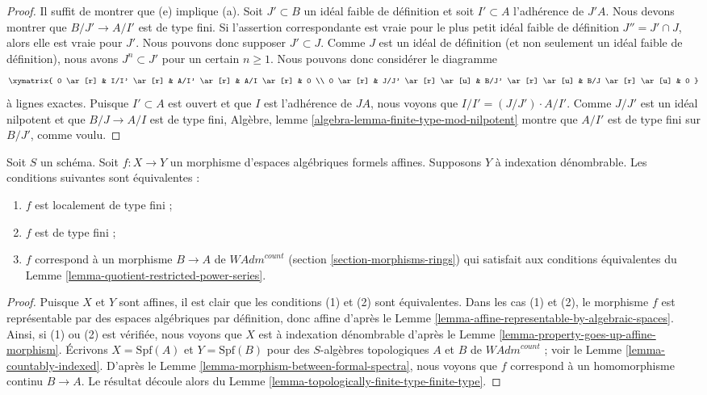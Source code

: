 \begin{proof}
Il suffit de montrer que (e) implique (a). Soit $J' \subset B$ un idéal faible
de définition et soit $I' \subset A$ l'adhérence de $J'A$. Nous devons
montrer que $B/J' \to A/I'$ est de type fini. Si l'assertion correspondante
est vraie pour le plus petit idéal faible de définition $J'' = J' \cap J$, alors elle
est vraie pour $J'$. Nous pouvons donc supposer $J' \subset J$. Comme $J$ est un idéal
de définition (et non seulement un idéal faible de définition), nous avons
$J^n \subset J'$ pour un certain $n \geq 1$. Nous pouvons donc considérer le
diagramme
$$
\xymatrix{
0 \ar[r] & I/I' \ar[r] & A/I' \ar[r] & A/I \ar[r] & 0 \\
0 \ar[r] & J/J' \ar[r] \ar[u] & B/J' \ar[r] \ar[u] & B/J \ar[r] \ar[u] & 0
}
$$
à lignes exactes. Puisque $I' \subset A$ est ouvert et que
$I$ est l'adhérence de $J A$, nous voyons que $I/I' = (J/J') \cdot A/I'$.
Comme $J/J'$ est un idéal nilpotent et que $B/J \to A/I$ est de type fini,
Algèbre, lemme \ref{algebra-lemma-finite-type-mod-nilpotent} montre
que $A/I'$ est de type fini sur $B/J'$, comme voulu.
\end{proof}

\begin{lemma}
\label{lemma-representable-affine-finite-type}
Soit $S$ un schéma. Soit $f : X \to Y$ un morphisme d'espaces algébriques
formels affines. Supposons $Y$ à indexation dénombrable.
Les conditions suivantes sont équivalentes :
\begin{enumerate}
\item $f$ est localement de type fini ;
\item $f$ est de type fini ;
\item $f$ correspond à un morphisme $B \to A$ de $\textit{WAdm}^{count}$
(section \ref{section-morphisms-rings})
qui satisfait aux conditions équivalentes du
Lemme \ref{lemma-quotient-restricted-power-series}.
\end{enumerate}
\end{lemma}

\begin{proof}
Puisque $X$ et $Y$ sont affines, il est clair que les conditions (1)
et (2) sont équivalentes. Dans les cas (1) et (2), le morphisme $f$
est représentable par des espaces algébriques par définition, donc
affine d'après le Lemme \ref{lemma-affine-representable-by-algebraic-spaces}.
Ainsi, si (1) ou (2) est vérifiée, nous voyons que
$X$ est à indexation dénombrable d'après le
Lemme \ref{lemma-property-goes-up-affine-morphism}.
Écrivons $X = \text{Spf}(A)$ et $Y = \text{Spf}(B)$
pour des $S$-algèbres topologiques $A$ et $B$ de $\textit{WAdm}^{count}$ ; voir le
Lemme \ref{lemma-countably-indexed}. D'après le
Lemme \ref{lemma-morphism-between-formal-spectra},
nous voyons que $f$ correspond à un homomorphisme continu $B \to A$.
Le résultat découle alors du
Lemme \ref{lemma-topologically-finite-type-finite-type}.
\end{proof}


